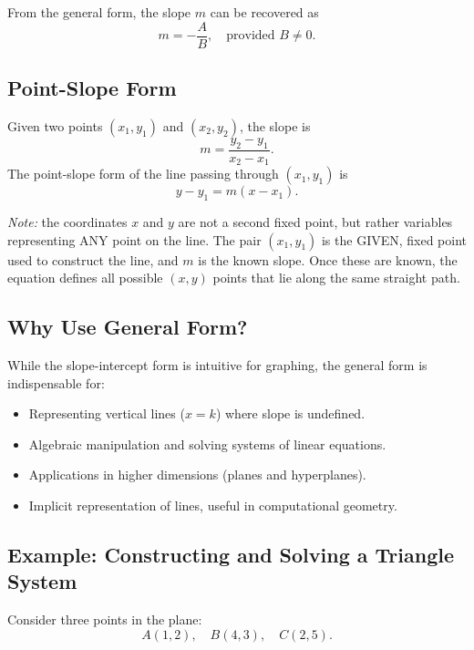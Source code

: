 \documentclass[10pt,twocolumn]{article}
\begin{document}
From the general form, the slope \(m\) can be recovered as
\begin{equation}
m = -\frac{A}{B}, \quad \text{provided } B \neq 0.
\end{equation}

\subsection{Point-Slope Form}

Given two points \((x_1, y_1)\) and \((x_2, y_2)\), the slope is
\begin{equation}
m = \frac{y_2 - y_1}{x_2 - x_1}.
\end{equation}
The point-slope form of the line passing through \((x_1, y_1)\) is
\begin{equation}
y - y_1 = m(x - x_1).
\end{equation}

\emph{Note:} the coordinates \( x \) and \( y \) are not a second fixed point, but rather variables representing ANY point on the line. The pair \( (x_1,y_1) \) is the GIVEN, fixed point used to construct the line, and \( m \) is the known slope. Once these are known, the equation defines all possible \( (x,y) \) points that lie along the same straight path.

\subsection{Why Use General Form?}

While the slope-intercept form is intuitive for graphing, the general form is indispensable for:

\begin{itemize}
    \item Representing vertical lines (\(x = k\)) where slope is undefined.
    \item Algebraic manipulation and solving systems of linear equations.
    \item Applications in higher dimensions (planes and hyperplanes).
    \item Implicit representation of lines, useful in computational geometry.
\end{itemize}

\subsection{Example: Constructing and Solving a Triangle System}

Consider three points in the plane:
\[
A(1,2), \quad B(4,3), \quad C(2,5).
\]
\end{document}
